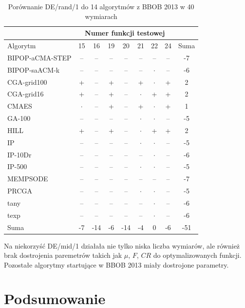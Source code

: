 \documentclass[a4paper,onecolumn,oneside,12pt,wide,floatssmall]{mwrep}
\theoremstyle{definition}
\theoremstyle{plain}%
\theoremstyle{remark}
\begin{document}
\begin{table}[H]
\centering
\begin{tabular}{ | l | c | c | c | c | c | c | c | c | }
\hline		 & \multicolumn{7}{c|}{Numer funkcji testowej} & \\  \hline
Algorytm         &15& 16& 19& 20& 21& 22& 24 & Suma \\  \hline
BIPOP-aCMA-STEP	 & -- & -- & -- & -- & -- & -- & -- & -7 \\
BIPOP-saACM-k	 & -- & -- & -- & -- & -- & $\cdot$ & -- & -6 \\
CGA-grid100	 & + & -- & + & -- & + & $\cdot$ & + & 2 \\
CGA-grid16	 & + & -- & + & -- & $\cdot$ & + & + & 2\\
CMAES	 & $\cdot$ & -- & + & -- & + & $\cdot$ & + & 1 \\
GA-100	 & -- & -- & -- & -- & $\cdot$ & $\cdot$ & -- & -5 \\
HILL	 & + & -- & + & -- & $\cdot$ & + & + & 2 \\
IP	 & -- & -- & -- & -- & $\cdot$ & $\cdot$ & -- & -5 \\
IP-10Dr	 & -- & -- & -- & -- & -- & $\cdot$ & -- & -6 \\
IP-500	 & -- & -- & -- & -- & $\cdot$ & $\cdot$ & -- & -5\\
MEMPSODE	 & -- & -- & -- & -- & -- & -- & -- & -7 \\
PRCGA	 & -- & -- & -- & -- & $\cdot$ & $\cdot$ & -- & -5\\
tany	 & -- & -- & -- & -- & -- & $\cdot$ & -- & -6 \\
texp	 & -- & -- & -- & -- & -- & $\cdot$ & -- & -6 \\ \hline
Suma     & -7 & -14 & -6 & -14 & -4 & 0 & -6 & -51 \\ \hline
\end{tabular}
\caption{Porównanie DE/rand/1 do 14 algorytmów z BBOB 2013 w 40 wymiarach}
\label{table:bbob2013rand40}
\end{table}

Na niekorzyść DE/mid/1 działała nie tylko niska liczba wymiarów, ale również brak dostrojenia
paremetrów takich jak $\mu$, $F$, $CR$ do optymalizowanych funkcji. Pozostałe algorytmy startujące
w BBOB 2013 miały dostrojone parametry.

\chapter{Podsumowanie}
\end{document}
